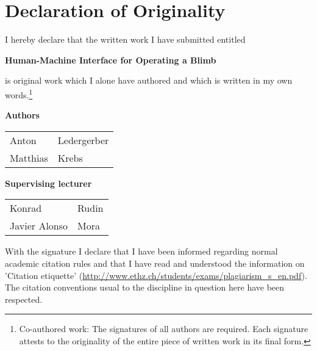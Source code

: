 %

\section*{Declaration of Originality}

\vspace{1cm}

I hereby declare that the written work I have submitted entitled

\vspace{0.5cm}

\textbf{Human-Machine Interface for Operating a Blimb}

\vspace{0.5cm}

is original work which I alone have authored and which is written in my own words.\footnote{Co-authored work: The signatures of all authors are required. Each signature attests to the originality of the entire piece of written work in its final form.}

\vspace{1cm}

\textbf{Authors}

\vspace{0.5cm}

\begin{tabular}{ p{5cm} p{5cm} }
  Anton & Ledergerber \\
  Matthias & Krebs \\
\end{tabular}

\vspace{0.5cm}

\textbf{Supervising lecturer}

\vspace{0.5cm}

\begin{tabular}{ p{5cm} p{5cm} }
  Konrad & Rudin \\
  Javier Alonso & Mora \\
\end{tabular}

\vspace{1cm}

With the signature I declare that I have been informed regarding normal academic citation rules and that I have read and understood the information on 'Citation etiquette' (\url{http://www.ethz.ch/students/exams/plagiarism_s_en.pdf}). The citation conventions usual to the discipline in question here have been respected.

